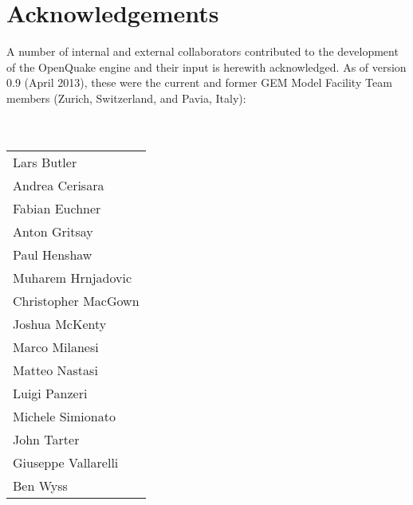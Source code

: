 \chapter*{Acknowledgements}
A number of internal and external collaborators contributed to 
the development of the OpenQuake engine and their input is herewith acknowledged. 
As of version 0.9 (April 2013), these were the current and former GEM Model Facility Team members (Zurich, Switzerland,
and Pavia, Italy): \hfill \\
\hfill \\
\hfill \\
\begin{tabular}{l}
Lars Butler \\
Andrea Cerisara \\
Fabian Euchner \\
Anton Gritsay \\
Paul Henshaw \\
Muharem Hrnjadovic \\
Christopher MacGown \\
Joshua McKenty \\
Marco Milanesi \\
Matteo Nastasi \\
Luigi Panzeri \\
Michele Simionato \\
John Tarter \\
Giuseppe Vallarelli \\
Ben Wyss \\
\end{tabular} \hfill \\
%

